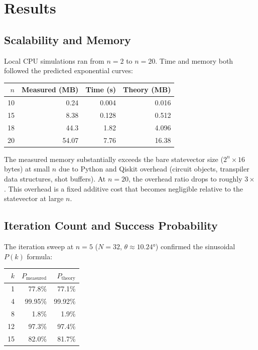 \documentclass[sigconf, authorversion=true, nonacm=true]{acmart}
\begin{document}
\section{Results}

\subsection{Scalability and Memory}

Local CPU simulations ran from $n=2$ to $n=20$. Time and memory both followed the predicted exponential curves:

\begin{center}
\begin{tabular}{rrrr}
\toprule
$n$ & Measured (MB) & Time (s) & Theory (MB) \\
\midrule
10 & 0.24  & 0.004 & 0.016 \\
15 & 8.38  & 0.128 & 0.512 \\
18 & 44.3  & 1.82  & 4.096 \\
20 & 54.07 & 7.76  & 16.38 \\
\bottomrule
\end{tabular}
\end{center}

The measured memory substantially exceeds the bare statevector size ($2^n \times 16$ bytes) at small $n$ due to Python and Qiskit overhead (circuit objects, transpiler data structures, shot buffers). At $n=20$, the overhead ratio drops to roughly $3\times$. This overhead is a fixed additive cost that becomes negligible relative to the statevector at large $n$.

\subsection{Iteration Count and Success Probability}

The iteration sweep at $n=5$ ($N=32$, $\theta \approx 10.24°$) confirmed the sinusoidal $P(k)$ formula:

\begin{center}
\begin{tabular}{rrr}
\toprule
$k$ & $P_{\text{measured}}$ & $P_{\text{theory}}$ \\
\midrule
1 & 77.8\% & 77.1\% \\
4 & 99.95\% & 99.92\% \\
8 & 1.8\%  & 1.9\%  \\
12 & 97.3\% & 97.4\% \\
15 & 82.0\% & 81.7\% \\
\bottomrule
\end{tabular}
\end{center}
\end{document}
